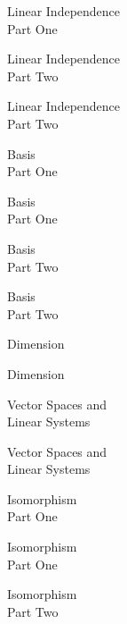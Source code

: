 \documentclass{titlescreen}
\begin{document}
\begin{videotitle}
  Linear Independence  \\[1ex]
  Part One
\end{videotitle}
\begin{videoend}
  Linear Independence \\[1ex]
  Part Two 
\end{videoend}

% 
\begin{videotitle}
  Linear Independence  \\[1ex]
  Part Two
\end{videotitle}
\begin{videoend}
  Basis \\[1ex]
  Part One
\end{videoend}


\begin{videotitle}
  Basis  \\[1ex]
  Part One
\end{videotitle}
\begin{videoend}
  Basis \\[1ex]
  Part Two 
\end{videoend}

% 
\begin{videotitle}
  Basis  \\[1ex]
  Part Two
\end{videotitle}
\begin{videoend}
  Dimension
\end{videoend}


\begin{videotitle}
  Dimension  
\end{videotitle}
\begin{videoend}
  Vector Spaces and \\[0.5ex]
  Linear Systems
\end{videoend}

\begin{videotitle}
  Vector Spaces and \\[0.5ex]
  Linear Systems 
\end{videotitle}
\begin{videoend}
  Isomorphism \\[1ex]
  Part One
\end{videoend}





\begin{videotitle}
  Isomorphism  \\[1ex]
  Part One
\end{videotitle}
\begin{videoend}
  Isomorphism \\[1ex]
  Part Two 
\end{videoend}
\end{document}
